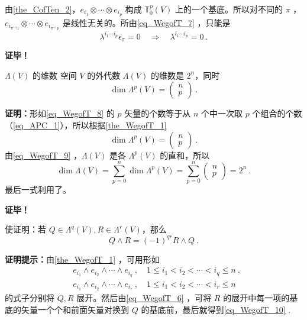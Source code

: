 由\autoref{the_CofTen_2}，$e_{i_1}\otimes\cdots\otimes e_{i_p}$ 构成 $\mathbb T_0^p(V)$ 上的一个基底。所以对不同的 $\pi$ ，$e_{i_{\pi^{-1} 1}}\otimes\cdots\otimes e_{i_{\pi^{-1} p}}$ 是线性无关的。所由\autoref{eq_WegofT_7}  ，只能是
\begin{equation}
\lambda^{i_1\cdots i_p}\epsilon_\pi=0\quad\Rightarrow\quad\lambda^{i_1\cdots i_p}=0~.
\end{equation}

\textbf{证毕！}
\begin{corollary}{ $\Lambda(V)$ 的维数}
空间 $V$ 的外代数 $\Lambda(V)$ 的维数是 $2^n$，同时
\begin{equation}
\dim\Lambda^p(V)=\left(\begin{aligned}
n\\p
\end{aligned}\right)~.
\end{equation}
\end{corollary}
\textbf{证明：}形如\autoref{eq_WegofT_8}  的 $p$ 矢量的个数等于从 $n$ 个中一次取 $p$ 个组合的个数（\autoref{eq_APC_1}），所以根据\autoref{the_WegofT_1} 
\begin{equation}
\dim\Lambda^p(V)=\left(\begin{aligned}
n\\p
\end{aligned}\right)~.
\end{equation}
由\autoref{eq_WegofT_9}  ，$\Lambda(V)$ 是各 $\Lambda^p(V)$ 的直和，所以
\begin{equation}
\dim\Lambda(V)=\sum_{p=0}^n\dim\Lambda^p(V)=\sum_{p=0}^n\left(\begin{aligned}
n\\p
\end{aligned}\right)=2^n~.
\end{equation}
 最后一式利用了。

\textbf{证毕！}

\begin{example}{}
使证明：若 $Q\in\Lambda^q(V), R\in\Lambda^r(V)$，那么
\begin{equation}\label{eq_WegofT_10}
Q\wedge R=(-1)^{qr}R\wedge Q~.
\end{equation}

\textbf{证明提示：}由\autoref{the_WegofT_1}  ，可用形如
 \begin{equation}
\begin{aligned}
&e_{i_1}\wedge e_{i_2}\wedge\cdots\wedge e_{i_q}~,\quad 1\leq i_1<i_2<\cdots<i_q\leq n~,\\
&e_{i_1}\wedge e_{i_2}\wedge\cdots\wedge e_{i_r}~,\quad 1\leq i_1<i_2<\cdots<i_r\leq n
\end{aligned}
\end{equation}
的式子分别将 $Q,R$ 展开。然后由\autoref{eq_WegofT_6}  ，可将 $R$ 的展开中每一项的基底的矢量一个个和前面矢量对换到 $Q$ 的基底前，最后就得到\autoref{eq_WegofT_10} .
\end{example}
